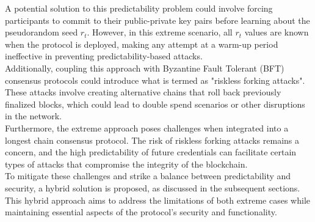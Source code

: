 A potential solution to this predictability problem could involve forcing participants to commit to their public-private key pairs before learning about the pseudorandom seed $r_t$. However, in this extreme scenario, all $r_t$ values are known when the protocol is deployed, making any attempt at a warm-up period ineffective in preventing predictability-based attacks.\\
Additionally, coupling this approach with Byzantine Fault Tolerant (BFT) consensus protocols could introduce what is termed as "riskless forking attacks". These attacks involve creating alternative chains that roll back previously finalized blocks, which could lead to double spend scenarios or other disruptions in the network.\\
Furthermore, the extreme approach poses challenges when integrated into a longest chain consensus protocol. The risk of riskless forking attacks remains a concern, and the high predictability of future credentials can facilitate certain types of attacks that compromise the integrity of the blockchain.\\
To mitigate these challenges and strike a balance between predictability and security, a hybrid solution is proposed, as discussed in the subsequent sections. This hybrid approach aims to address the limitations of both extreme cases while maintaining essential aspects of the protocol's security and functionality.

